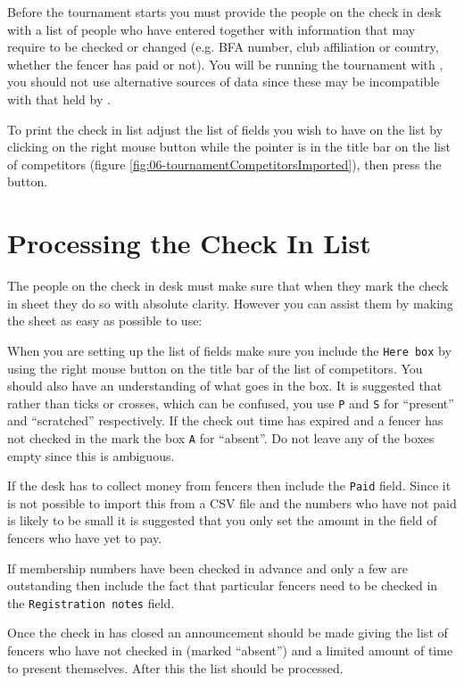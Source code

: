 \documentclass[a4paper,11pt]{memoir}
\begin{document}
Before the tournament starts you must provide the people on the check in desk with a list of people who have entered together with information that may require to be checked or changed (e.g. BFA number, club affiliation or country, whether the fencer has paid or not).
You will be running the tournament with \fencingtime{}, you should not use alternative sources of data since these may be incompatible with that held by \fencingtime{}.

To print the check in list adjust the list of fields you wish to have on the list by clicking on the right mouse button while the pointer is in the title bar on the list of competitors (figure \ref{fig:06-tournamentCompetitorsImported}), then press the  button. 

\section{Processing the Check In List}

The people on the check in desk must make sure that when they mark the check in sheet they do so with absolute clarity. However you can assist them by making the sheet as easy as possible to use:

When you are setting up the list of fields make sure you include the \texttt{Here box} by using the right mouse button on the title bar of the list of competitors. You should also have an understanding of what goes in the box. It is suggested that rather than ticks or crosses, which can be confused, you use \texttt{P} and \texttt{S} for “present” and “scratched” respectively. If the check out time has expired and a fencer has not checked in the mark the box \texttt{A} for “absent”. Do not leave any of the boxes empty since this is ambiguous.

If the desk has to collect money from fencers then include the \texttt{Paid} field. Since it is not possible to import this from a CSV file and the numbers who have not paid is likely to be small it is suggested that you only set the amount in the field of fencers who have yet to pay.

If membership numbers have been checked in advance and only a few are outstanding then include the fact that particular fencers need to be checked in the \texttt{Registration notes} field.

Once the check in has closed an announcement should be made giving the list of fencers who have not checked in (marked “absent”) and a limited amount of time to present themselves. After this the list should be processed. 
\end{document}
